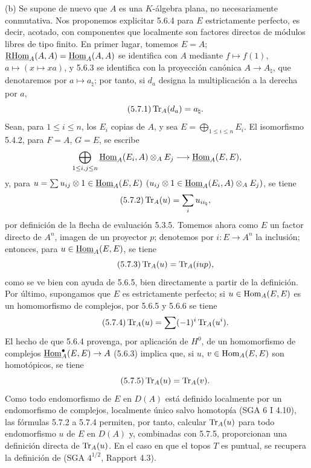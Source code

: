 (b) Se supone de nuevo que $A$ es una $K$-álgebra plana, no necesariamente conmutativa. Nos proponemos explicitar 5.6.4 para $E$ estrictamente perfecto, es decir, acotado, con componentes que localmente son factores directos de módulos libres de tipo finito. En primer lugar, tomemos $E=A$; $\underline{\mathrm{RHom}}_A(A,A)=\underline{\operatorname{Hom}}_A(A,A)$ se identifica con $A$ mediante $f\mapsto f(1)$, $a\mapsto(x\mapsto xa)$, y 5.6.3 se identifica con la proyección canónica $A\to A_\natural$, que denotaremos por $a\mapsto a_\natural$; por tanto, si $d_a$ designa la multiplicación a la derecha por $a$,
\begin{equation}\tag{5.7.1}
\operatorname{Tr}_A(d_a)=a_\natural.
\end{equation}
Sean, para $1\le i\le n$, los $E_i$ copias de $A$, y sea $E=\bigoplus_{1\le i\le n}E_i$. El isomorfismo 5.4.2, para $F=A$, $G=E$, se escribe
\[
\bigoplus_{1\le i,j\le n}\underline{\operatorname{Hom}}_A(E_i,A)\otimes_AE_j\longrightarrow\underline{\operatorname{Hom}}_A(E,E),
\]
y, para $u=\sum u_{ij}\otimes 1\in\underline{\operatorname{Hom}}_A(E,E)$ $(u_{ij}\otimes 1\in\underline{\operatorname{Hom}}_A(E_i,A)\otimes_A E_j)$, se tiene
\begin{equation}\tag{5.7.2}
\operatorname{Tr}_A(u)=\sum_i u_{ii_\natural},
\end{equation}
por definición de la flecha de evaluación 5.3.5. Tomemos ahora como $E$ un factor directo de $A^n$, imagen de un proyector $p$; denotemos por $i:E\to A^n$ la inclusión; entonces, para $u\in\underline{\operatorname{Hom}}_A(E,E)$, se tiene
\begin{equation}\tag{5.7.3}
\operatorname{Tr}_A(u)=\operatorname{Tr}_A(iup),
\end{equation}
como se ve bien con ayuda de 5.6.5, bien directamente a partir de la definición. Por último, supongamos que $E$ es estrictamente perfecto; si $u\in\operatorname{Hom}_A(E,E)$ es un homomorfismo de complejos, por 5.6.5 y 5.6.6 se tiene
\begin{equation}\tag{5.7.4}
\operatorname{Tr}_A(u)=\sum(-1)^i\operatorname{Tr}_A(u^i).
\end{equation}
El hecho de que 5.6.4 provenga, por aplicación de $H^0$, de un homomorfismo de complejos $\underline{\operatorname{Hom}}_A^\bullet(E,E)\to A$ (5.6.3) implica que, si $u$, $v\in\operatorname{Hom}_A(E,E)$ son homotópicos, se tiene
\begin{equation}\tag{5.7.5}
\operatorname{Tr}_A(u)=\operatorname{Tr}_A(v).
\end{equation}
Como todo endomorfismo de $E$ en $D(A)$ está definido localmente por un endomorfismo de complejos, localmente único salvo homotopía (SGA 6 I 4.10), las fórmulas 5.7.2 a 5.7.4 permiten, por tanto, calcular $\operatorname{Tr}_A(u)$ para todo endomorfismo $u$ de $E$ en $D(A)$ y, combinadas con 5.7.5, proporcionan una definición directa de $\operatorname{Tr}_A(u)$. En el caso en que el topos $T$ es puntual, se recupera la definición de (SGA $4^{1/2}$, Rapport 4.3).
